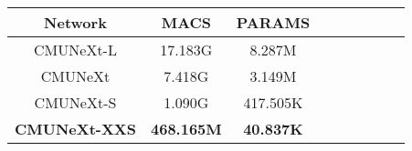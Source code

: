 \begin{tabular}{c|c|c|cc|cc|cc}
    \toprule[1.1pt]
    
    Network & MACS & PARAMS 
    \\
    
    \midrule[1.1pt]

    CMUNeXt-L
    & 17.183G & 8.287M 	%
    \\
    
    CMUNeXt
    & 7.418G & 3.149M 	%
    \\
    
    
    CMUNeXt-S
    & 1.090G & 417.505K 	%
    \\

    \midrule[0.7pt]

    \textbf{CMUNeXt-XXS}
    & \textbf{468.165M} & \textbf{40.837K}	%
    \\

    \bottomrule[1.1pt]
\end{tabular}
